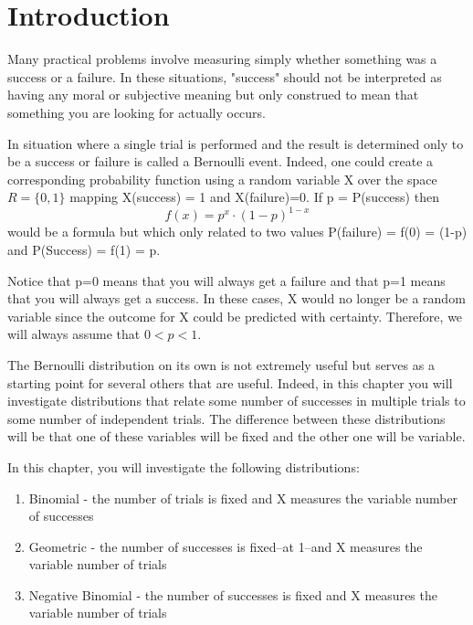 \documentclass[10pt,]{book}
\theoremstyle{plain}
\theoremstyle{definition}
\theoremstyle{definition}
\theoremstyle{definition}
\numberwithin{equation}{section}
\begin{document}
\section[{Introduction}]{Introduction}\label{section-34}
Many practical problems involve measuring simply whether something was a success or a failure. In these situations, "success" should not be interpreted as having any moral or subjective meaning but only construed to mean that something you are looking for actually occurs.%
\par
In situation where a single trial is performed and the result is determined only to be a success or failure is called a Bernoulli event. Indeed, one could create a corresponding probability function using a random variable X over the space \(R = \{0, 1 \}\) mapping X(success) = 1 and X(failure)=0. If p = P(success) then 
	\begin{equation*}f(x) = p^x \cdot (1-p)^{1-x}\end{equation*}
	would be a formula but which only related to two values P(failure) = f(0) = (1-p) and P(Success) = f(1) = p.  
\par
Notice that p=0 means that you will always get a failure and that p=1 means that you will always get a success. In these cases, X would no longer be a random variable since the outcome for X could be predicted with certainty. Therefore, we will always assume that \(0 < p < 1\).
\par

	The Bernoulli distribution on its own is not extremely useful but serves as a starting point for several others that are useful.  Indeed, in this chapter you will investigate distributions that relate some number of successes in multiple trials to some number of independent trials. The difference between these distributions will be that one of these variables will be fixed and the other one will be variable.
%
\par

In this chapter, you will investigate the following distributions:
\leavevmode%
\begin{enumerate}
\item\hypertarget{li-224}{}Binomial - the number of trials is fixed and X measures the variable number of successes%
\item\hypertarget{li-225}{}Geometric - the number of successes is fixed--at 1--and X measures the variable number of trials%
\item\hypertarget{li-226}{}Negative Binomial - the number of successes is fixed and X measures the variable number of trials%
\end{enumerate}
\end{document}
